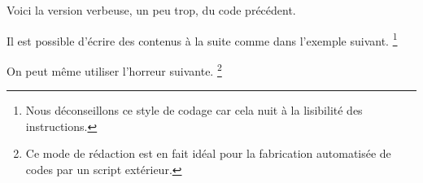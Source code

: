 \documentclass{tutodoc}
\begin{document}


Voici la version verbeuse, un peu trop, du code précédent.



Il est possible d'écrire des contenus à la suite comme dans l'exemple suivant.
\footnote{
    Nous déconseillons ce style de codage car cela nuit à la lisibilité des instructions.
}



On peut même utiliser l'horreur suivante.
\footnote{
    Ce mode de rédaction est en fait idéal pour la fabrication automatisée de codes par un script extérieur.
}

\end{document}
